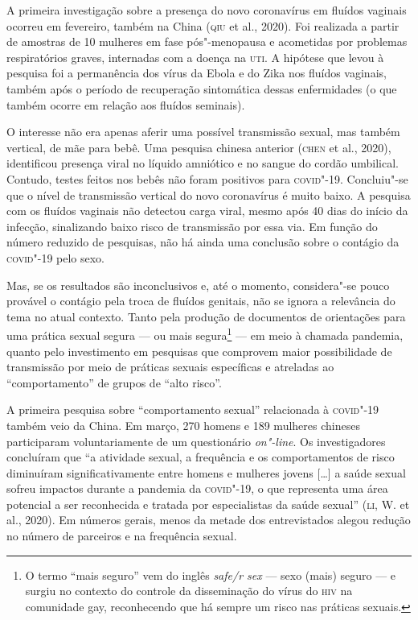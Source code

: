 A primeira investigação sobre a presença do novo coronavírus em fluídos
vaginais ocorreu em fevereiro, também na China (\textsc{qiu} et al., 2020). Foi
realizada a partir de amostras de 10 mulheres em fase pós"-menopausa e
acometidas por problemas respiratórios graves, internadas com a doença
na \textsc{uti}. A hipótese que levou à pesquisa foi a permanência dos vírus da
Ebola e do Zika nos fluídos vaginais, também após o período de
recuperação sintomática dessas enfermidades (o que também ocorre em
relação aos fluídos seminais).

O interesse não era apenas aferir uma possível transmissão sexual, mas
também vertical, de mãe para bebê. Uma pesquisa chinesa anterior (\textsc{chen}
et al., 2020), identificou presença viral no líquido amniótico e no
sangue do cordão umbilical. Contudo, testes feitos nos bebês não foram
positivos para \textsc{covid}"-19. Concluiu"-se que o nível de transmissão vertical
do novo coronavírus é muito baixo. A pesquisa com os fluídos vaginais
não detectou carga viral, mesmo após 40 dias do início da infecção,
sinalizando baixo risco de transmissão por essa via. Em função do número
reduzido de pesquisas, não há ainda uma conclusão sobre o contágio da
\textsc{covid}"-19 pelo sexo.

Mas, se os resultados são inconclusivos e, até o momento, considera"-se
pouco provável o contágio pela troca de fluídos genitais, não se ignora
a relevância do tema no atual contexto. Tanto pela produção de
documentos de orientações para uma prática sexual segura --- ou mais
segura\footnote{O termo ``mais seguro'' vem do inglês \emph{safe/r sex}
  --- sexo (mais) seguro --- e surgiu no contexto do controle da
  disseminação do vírus do \textsc{hiv} na comunidade gay, reconhecendo que há
  sempre um risco nas práticas sexuais.} --- em meio à chamada pandemia,
quanto pelo investimento em pesquisas que comprovem maior possibilidade
de transmissão por meio de práticas sexuais específicas e atreladas ao
``comportamento'' de grupos de ``alto risco''.

A primeira pesquisa sobre ``comportamento sexual'' relacionada à
\textsc{covid}"-19 também veio da China. Em março, 270 homens e 189 mulheres
chineses participaram voluntariamente de um questionário \emph{on"-line}.
Os investigadores concluíram que ``a atividade sexual, a frequência e os
comportamentos de risco diminuíram significativamente entre homens e
mulheres jovens {[}\ldots{}{]} a saúde sexual sofreu impactos durante a
pandemia da \textsc{covid}"-19, o que representa uma área potencial a ser
reconhecida e tratada por especialistas da saúde sexual'' (\textsc{li}, W. et
al., 2020). Em números gerais, menos da metade dos entrevistados alegou
redução no número de parceiros e na frequência sexual.

